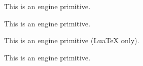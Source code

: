 \begin{function}[]
  {
    \kill
  }
  \begin{syntax}
  \end{syntax}

\end{function}



\begin{function}[]
  {
    \l@nohyphenation
  }
  \begin{syntax}
  \end{syntax}

\end{function}



\begin{function}[]
  {
    \language
  }
  \begin{syntax}
  \end{syntax}
  This is an engine primitive.
\end{function}



\begin{function}[]
  {
    \last@fontshape
  }
  \begin{syntax}
  \end{syntax}

\end{function}



\begin{function}[]
  {
    \lastbox
  }
  \begin{syntax}
  \end{syntax}
  This is an engine primitive.
\end{function}



\begin{function}[]
  {
    \lastnamedcs
  }
  \begin{syntax}
  \end{syntax}
  This is an engine primitive (Lua\TeX{} only).
\end{function}



\begin{function}[]
  {
    \lastnodetype
  }
  \begin{syntax}
  \end{syntax}
  This is an engine primitive.
\end{function}



